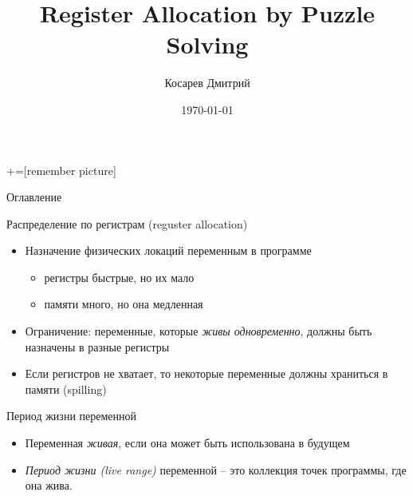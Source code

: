 \documentclass[aspectratio=169
  , xcolor={svgnames}
  , hyperref={ colorlinks,citecolor=DeepPink4
             , linkcolor=DarkRed,urlcolor=DarkBlue}
  , russian
  ]{beamer}
\title[]{Register Allocation by Puzzle Solving}
\author{Косарев Дмитрий }
\institute{матмех СПбГУ}
\date{\today}
\theoremstyle{exerciseStyle1}
\begin{document}
\maketitle

+=[remember picture] 

\everymath{\displaystyle}

\begin{frame}{Оглавление}
  \tableofcontents
\end{frame}

\begin{frame}{Распределение по регистрам (reguster allocation)}
\begin{itemize}
  \item Назначение физических локаций переменным в программе
    \begin{itemize}
      \item регистры быстрые, но их мало
      \item памяти много, но она медленная
    \end{itemize}
  \item Ограничение: переменные, которые \emph{живы одновременно}, должны быть назначены в разные регистры
  \item Если регистров не хватает, то некоторые переменные должны храниться в памяти (spilling)
\end{itemize}
\end{frame}


\begin{frame}{Период жизни переменной}
\begin{minipage}{.48\textwidth}
\begin{itemize}
\item Переменная \emph{живая}, если она может быть использована в будущем
\item \emph{Период жизни (live range)} переменной -- это коллекция точек программы, где она жива.
\end{itemize}
\end{minipage}

\end{frame}
\end{document}

